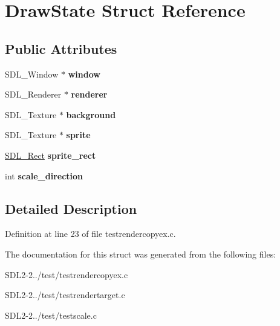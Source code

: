 \hypertarget{structDrawState}{\section{Draw\+State Struct Reference}
\label{structDrawState}
}
\subsection*{Public Attributes}
\begin{DoxyCompactItemize}
\item 
\hypertarget{structDrawState_a2c573b6bdc424d6d9c242147d7ea2862}{S\+D\+L\+\_\+\+Window $\ast$ {\bfseries window}}\label{structDrawState_a2c573b6bdc424d6d9c242147d7ea2862}

\item 
\hypertarget{structDrawState_acf7d6848c10bc708d3339d94b2470523}{S\+D\+L\+\_\+\+Renderer $\ast$ {\bfseries renderer}}\label{structDrawState_acf7d6848c10bc708d3339d94b2470523}

\item 
\hypertarget{structDrawState_a5f6ba850db759a441f9b9f363dd5c908}{S\+D\+L\+\_\+\+Texture $\ast$ {\bfseries background}}\label{structDrawState_a5f6ba850db759a441f9b9f363dd5c908}

\item 
\hypertarget{structDrawState_a420bab9533740a3d0a5bd5605f4e96cf}{S\+D\+L\+\_\+\+Texture $\ast$ {\bfseries sprite}}\label{structDrawState_a420bab9533740a3d0a5bd5605f4e96cf}

\item 
\hypertarget{structDrawState_aeac04df9ad6e1aeef5b878ee1027854a}{\hyperlink{structSDL__Rect}{S\+D\+L\+\_\+\+Rect} {\bfseries sprite\+\_\+rect}}\label{structDrawState_aeac04df9ad6e1aeef5b878ee1027854a}

\item 
\hypertarget{structDrawState_a93a2630b53d28c785fde10122ddce1c3}{int {\bfseries scale\+\_\+direction}}\label{structDrawState_a93a2630b53d28c785fde10122ddce1c3}

\end{DoxyCompactItemize}


\subsection{Detailed Description}


Definition at line 23 of file testrendercopyex.\+c.



The documentation for this struct was generated from the following files\+:\begin{DoxyCompactItemize}
\item 
S\+D\+L2-\/2../test/testrendercopyex.\+c\item 
S\+D\+L2-\/2../test/testrendertarget.\+c\item 
S\+D\+L2-\/2../test/testscale.\+c\end{DoxyCompactItemize}
